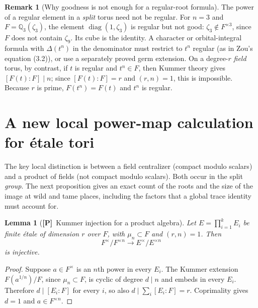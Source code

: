 \documentclass[11pt]{article}
\newcommand{\Ptag}{\textnormal{\textbf{[P]}}}
\theoremstyle{plain}
\newtheorem{lemma}[theorem]{Lemma}
\theoremstyle{definition}
\newtheorem{remark}[theorem]{Remark}
\begin{document}
\begin{remark}[Why goodness is not enough for a regular-root formula]\label{rem:power-singular}
The power of a regular element in a \emph{split} torus need not be
regular.  For $n=3$ and $F=\mathbb Q_3(\zeta_3)$, the element
$\operatorname{diag}(1,\zeta_3)$ is regular but not good:
$\zeta_3\notin F^{\times3}$, since $F$ does not contain $\zeta_9$.
Its cube is the identity.  A character or orbital-integral formula with
$\Delta(t^n)$ in the denominator must restrict to $t^n$ regular
(as in Zou's equation (3.2)), or use a separately proved germ extension.
On a degree-$r$ \emph{field} torus, by contrast, if $t$ is regular
and $t^n\in F$, then Kummer theory gives
$[F(t):F]\mid n$; since $[F(t):F]=r$ and $(r,n)=1$, this is
impossible.  Because $r$ is prime, $F(t^n)=F(t)$ and $t^n$ is regular.
\end{remark}

\section{A new local power-map calculation for \texorpdfstring{\'etale}{etale} tori}\label{sec:localpowers}
The key local distinction is between a field centralizer (compact
modulo scalars) and a product of fields (not compact modulo scalars).
Both occur in the split \emph{group}.  The next proposition gives
an exact count of the roots and the size of the image at wild and
tame places, including the factors that a global trace identity
must account for.

\begin{lemma}[\Ptag\ Kummer injection for a product algebra]\label{lem:Kumprod}
Let $E=\prod_{i=1}^kE_i$ be finite \emph{\'etale} of dimension $r$
over $F$, with $\mu_n\subset F$ and $(r,n)=1$.  Then
\begin{equation}\label{eq:Kummerinj}
 F^\times/F^{\times n}\longrightarrow
 E^\times/E^{\times n}
\end{equation}
is injective.
\end{lemma}
\begin{proof}
Suppose $a\in F^\times$ is an $n$th power in every $E_i$.
The Kummer extension $F(a^{1/n})/F$, since $\mu_n\subset F$,
is cyclic of degree $d\mid n$ and embeds in every $E_i$.
Therefore $d\mid[E_i:F]$ for every $i$, so also
$d\mid\sum_i[E_i:F]=r$.  Coprimality gives $d=1$ and
$a\in F^{\times n}$.
\end{proof}
\end{document}
